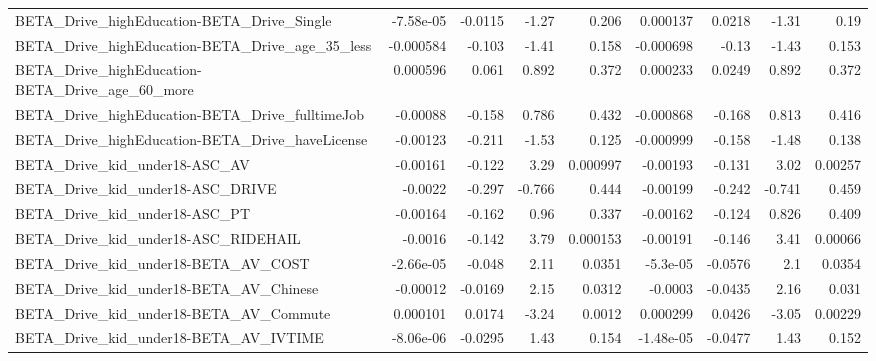 \begin{tabular}{lrrrrrrrr}
BETA\_Drive\_highEducation-BETA\_Drive\_Single         &   -7.58e-05 &      -0.0115 &     -1.27 &    0.206 &   0.000137 &      0.0218 &        -1.31 &          0.19 \\
BETA\_Drive\_highEducation-BETA\_Drive\_age\_35\_less    &   -0.000584 &       -0.103 &     -1.41 &    0.158 &  -0.000698 &       -0.13 &        -1.43 &         0.153 \\
BETA\_Drive\_highEducation-BETA\_Drive\_age\_60\_more    &    0.000596 &        0.061 &     0.892 &    0.372 &   0.000233 &      0.0249 &        0.892 &         0.372 \\
BETA\_Drive\_highEducation-BETA\_Drive\_fulltimeJob    &    -0.00088 &       -0.158 &     0.786 &    0.432 &  -0.000868 &      -0.168 &        0.813 &         0.416 \\
BETA\_Drive\_highEducation-BETA\_Drive\_haveLicense    &    -0.00123 &       -0.211 &     -1.53 &    0.125 &  -0.000999 &      -0.158 &        -1.48 &         0.138 \\
BETA\_Drive\_kid\_under18-ASC\_AV                      &    -0.00161 &       -0.122 &      3.29 & 0.000997 &   -0.00193 &      -0.131 &         3.02 &       0.00257 \\
BETA\_Drive\_kid\_under18-ASC\_DRIVE                   &     -0.0022 &       -0.297 &    -0.766 &    0.444 &   -0.00199 &      -0.242 &       -0.741 &         0.459 \\
BETA\_Drive\_kid\_under18-ASC\_PT                      &    -0.00164 &       -0.162 &      0.96 &    0.337 &   -0.00162 &      -0.124 &        0.826 &         0.409 \\
BETA\_Drive\_kid\_under18-ASC\_RIDEHAIL                &     -0.0016 &       -0.142 &      3.79 & 0.000153 &   -0.00191 &      -0.146 &         3.41 &       0.00066 \\
BETA\_Drive\_kid\_under18-BETA\_AV\_COST                &   -2.66e-05 &       -0.048 &      2.11 &   0.0351 &   -5.3e-05 &     -0.0576 &          2.1 &        0.0354 \\
BETA\_Drive\_kid\_under18-BETA\_AV\_Chinese             &    -0.00012 &      -0.0169 &      2.15 &   0.0312 &    -0.0003 &     -0.0435 &         2.16 &         0.031 \\
BETA\_Drive\_kid\_under18-BETA\_AV\_Commute             &    0.000101 &       0.0174 &     -3.24 &   0.0012 &   0.000299 &      0.0426 &        -3.05 &       0.00229 \\
BETA\_Drive\_kid\_under18-BETA\_AV\_IVTIME              &   -8.06e-06 &      -0.0295 &      1.43 &    0.154 &  -1.48e-05 &     -0.0477 &         1.43 &         0.152 \\

\end{tabular}
